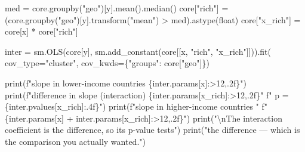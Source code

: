 \documentclass[
  letterpaper,
  10pt,
  twoside,
  openright,
  numbers=noenddot,
  chapterprefix=true]{scrbook}
\newenvironment{Shaded}{}{}
\newcommand{\BuiltInTok}[1]{\textcolor[rgb]{0.84,0.23,0.29}{#1}}
\newcommand{\CharTok}[1]{\textcolor[rgb]{0.01,0.18,0.38}{#1}}
\newcommand{\NormalTok}[1]{\textcolor[rgb]{0.14,0.16,0.18}{#1}}
\newcommand{\OperatorTok}[1]{\textcolor[rgb]{0.14,0.16,0.18}{#1}}
\newcommand{\SpecialCharTok}[1]{\textcolor[rgb]{0.00,0.36,0.77}{#1}}
\newcommand{\SpecialStringTok}[1]{\textcolor[rgb]{0.01,0.18,0.38}{#1}}
\newcommand{\StringTok}[1]{\textcolor[rgb]{0.01,0.18,0.38}{#1}}
\begin{document}
\label{check-interaction}
\begin{Shaded}
\begin{Highlighting}[]
\NormalTok{med }\OperatorTok{=}\NormalTok{ core.groupby(}\StringTok{"geo"}\NormalTok{)[y].mean().median()}
\NormalTok{core[}\StringTok{"rich"}\NormalTok{] }\OperatorTok{=}\NormalTok{ (core.groupby(}\StringTok{"geo"}\NormalTok{)[y].transform(}\StringTok{"mean"}\NormalTok{) }\OperatorTok{\textgreater{}}\NormalTok{ med).astype(}\BuiltInTok{float}\NormalTok{)}
\NormalTok{core[}\StringTok{"x\_rich"}\NormalTok{] }\OperatorTok{=}\NormalTok{ core[x] }\OperatorTok{*}\NormalTok{ core[}\StringTok{"rich"}\NormalTok{]}

\NormalTok{inter }\OperatorTok{=}\NormalTok{ sm.OLS(core[y], sm.add\_constant(core[[x, }\StringTok{"rich"}\NormalTok{, }\StringTok{"x\_rich"}\NormalTok{]])).fit(}
\NormalTok{    cov\_type}\OperatorTok{=}\StringTok{"cluster"}\NormalTok{, cov\_kwds}\OperatorTok{=}\NormalTok{\{}\StringTok{"groups"}\NormalTok{: core[}\StringTok{"geo"}\NormalTok{]\})}

\BuiltInTok{print}\NormalTok{(}\SpecialStringTok{f"slope in lower{-}income countries      }\SpecialCharTok{\{}\NormalTok{inter}\SpecialCharTok{.}\NormalTok{params[x]}\SpecialCharTok{:\textgreater{}12,.2f\}}\SpecialStringTok{"}\NormalTok{)}
\BuiltInTok{print}\NormalTok{(}\SpecialStringTok{f"difference in slope (interaction)    }\SpecialCharTok{\{}\NormalTok{inter}\SpecialCharTok{.}\NormalTok{params[}\StringTok{\textquotesingle{}x\_rich\textquotesingle{}}\NormalTok{]}\SpecialCharTok{:\textgreater{}12,.2f\}}\SpecialStringTok{"}
      \SpecialStringTok{f"   p = }\SpecialCharTok{\{}\NormalTok{inter}\SpecialCharTok{.}\NormalTok{pvalues[}\StringTok{\textquotesingle{}x\_rich\textquotesingle{}}\NormalTok{]}\SpecialCharTok{:.4f\}}\SpecialStringTok{"}\NormalTok{)}
\BuiltInTok{print}\NormalTok{(}\SpecialStringTok{f"slope in higher{-}income countries     "}
      \SpecialStringTok{f"}\SpecialCharTok{\{}\NormalTok{inter}\SpecialCharTok{.}\NormalTok{params[x] }\OperatorTok{+}\NormalTok{ inter}\SpecialCharTok{.}\NormalTok{params[}\StringTok{\textquotesingle{}x\_rich\textquotesingle{}}\NormalTok{]}\SpecialCharTok{:\textgreater{}12,.2f\}}\SpecialStringTok{"}\NormalTok{)}
\BuiltInTok{print}\NormalTok{(}\StringTok{"}\CharTok{\textbackslash{}n}\StringTok{The interaction coefficient is the difference, so its p{-}value tests"}\NormalTok{)}
\BuiltInTok{print}\NormalTok{(}\StringTok{"the difference — which is the comparison you actually wanted."}\NormalTok{)}
\end{Highlighting}
\end{Shaded}
\end{document}
